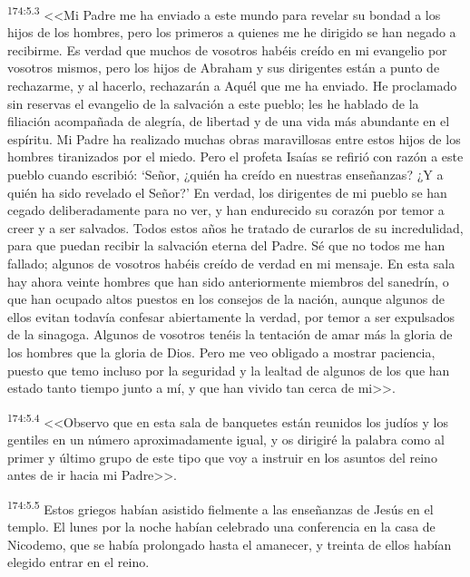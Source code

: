 \par 
\textsuperscript{174:5.3} <<Mi Padre me ha enviado a este mundo para revelar su bondad a los hijos de los hombres, pero los primeros a quienes me he dirigido se han negado a recibirme. Es verdad que muchos de vosotros habéis creído en mi evangelio por vosotros mismos, pero los hijos de Abraham y sus dirigentes están a punto de rechazarme, y al hacerlo, rechazarán a Aquél que me ha enviado. He proclamado sin reservas el evangelio de la salvación a este pueblo; les he hablado de la filiación acompañada de alegría, de libertad y de una vida más abundante en el espíritu. Mi Padre ha realizado muchas obras maravillosas entre estos hijos de los hombres tiranizados por el miedo. Pero el profeta Isaías se refirió con razón a este pueblo cuando escribió: `Señor, ¿quién ha creído en nuestras enseñanzas? ¿Y a quién ha sido revelado el Señor?' En verdad, los dirigentes de mi pueblo se han cegado deliberadamente para no ver, y han endurecido su corazón por temor a creer y a ser salvados. Todos estos años he tratado de curarlos de su incredulidad, para que puedan recibir la salvación eterna del Padre. Sé que no todos me han fallado; algunos de vosotros habéis creído de verdad en mi mensaje. En esta sala hay ahora veinte hombres que han sido anteriormente miembros del sanedrín, o que han ocupado altos puestos en los consejos de la nación, aunque algunos de ellos evitan todavía confesar abiertamente la verdad, por temor a ser expulsados de la sinagoga. Algunos de vosotros tenéis la tentación de amar más la gloria de los hombres que la gloria de Dios. Pero me veo obligado a mostrar paciencia, puesto que temo incluso por la seguridad y la lealtad de algunos de los que han estado tanto tiempo junto a mí, y que han vivido tan cerca de mi>>.

\par 
\textsuperscript{174:5.4} <<Observo que en esta sala de banquetes están reunidos los judíos y los gentiles en un número aproximadamente igual, y os dirigiré la palabra como al primer y último grupo de este tipo que voy a instruir en los asuntos del reino antes de ir hacia mi Padre>>.

\par 
\textsuperscript{174:5.5} Estos griegos habían asistido fielmente a las enseñanzas de Jesús en el templo. El lunes por la noche habían celebrado una conferencia en la casa de Nicodemo, que se había prolongado hasta el amanecer, y treinta de ellos habían elegido entrar en el reino.

